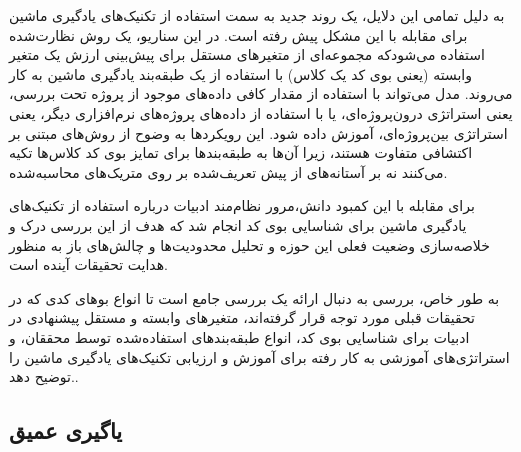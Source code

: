 به دلیل تمامی این دلایل، یک روند جدید به سمت استفاده از تکنیک‌های یادگیری ماشین برای مقابله با این مشکل پیش رفته است. در این سناریو، یک روش نظارت‌شده استفاده می‌شودکه مجموعه‌ای از متغیرهای مستقل برای پیش‌بینی ارزش یک متغیر وابسته (یعنی بوی کد یک کلاس) با استفاده از یک طبقه‌بند یادگیری ماشین به کار می‌روند. مدل می‌تواند با استفاده از مقدار کافی داده‌های موجود از پروژه تحت بررسی، یعنی استراتژی درون‌پروژه‌ای، یا با استفاده از داده‌های پروژه‌های نرم‌افزاری دیگر، یعنی استراتژی بین‌پروژه‌ای، آموزش داده شود. این رویکردها به وضوح از روش‌های مبتنی بر اکتشافی متفاوت هستند، زیرا آن‌ها به طبقه‌بندها برای تمایز بوی کد کلاس‌ها تکیه می‌کنند نه بر آستانه‌های از پیش تعریف‌شده بر روی متریک‌های محاسبه‌شده.

برای مقابله با این کمبود دانش،مرور نظام‌مند ادبیات  درباره استفاده از تکنیک‌های یادگیری ماشین برای شناسایی بوی کد انجام شد که هدف از این بررسی درک و خلاصه‌سازی وضعیت فعلی این حوزه و تحلیل محدودیت‌ها و چالش‌های باز به منظور هدایت تحقیقات آینده است.

به طور خاص، بررسی به دنبال ارائه یک بررسی جامع است تا انواع بوهای کدی که در تحقیقات قبلی مورد توجه قرار گرفته‌اند، متغیرهای وابسته و مستقل پیشنهادی در ادبیات برای شناسایی بوی کد، انواع طبقه‌بندهای استفاده‌شده توسط محققان، و استراتژی‌های آموزشی به کار رفته برای آموزش و ارزیابی تکنیک‌های یادگیری ماشین را توضیح دهد..
\subsection{یاگیری عمیق}

\clearpage
